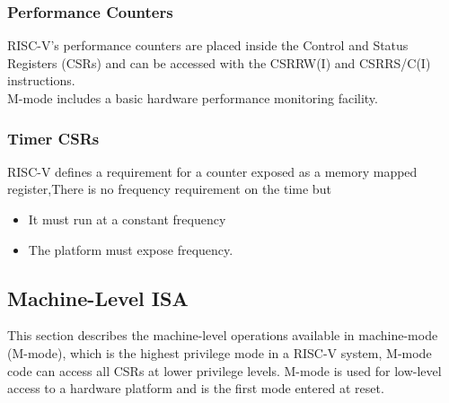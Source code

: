 \documentclass[../main.tex]{subfiles}
\begin{document}
\subsubsection*{ Performance Counters}
             RISC-V's performance counters are placed inside the Control and Status Registers (CSRs) and can be accessed with the CSRRW(I) and CSRRS/C(I) instructions.\\
             M-mode includes a basic hardware performance monitoring facility. 

             
  \subsubsection*{ Timer CSRs}
             RISC-V defines a requirement for a counter exposed as a memory mapped register,There is no frequency requirement on the time but
             \begin{itemize}
\item It must run at a constant
frequency
\item The platform must expose
frequency.\\          
          \end{itemize} 

\subsection{Machine-Level ISA}
This section describes the machine-level operations available in machine-mode (M-mode), which is the highest privilege mode in a RISC-V system, M-mode code can access all CSRs
at lower privilege levels. M-mode is used for low-level access to a hardware platform and is the first mode entered at reset.\\
\end{document}
